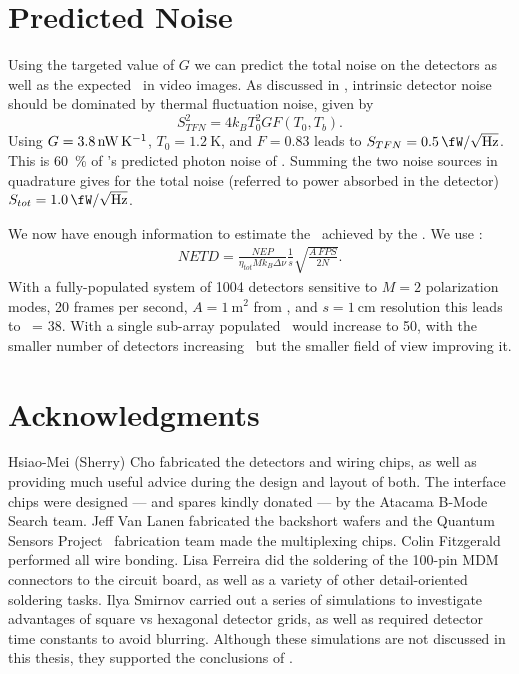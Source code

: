 \section{Predicted Noise} \label{sec:ch5-predicted-noise}

Using the targeted value of $G$ we can predict the total noise on the detectors as well as the expected \NETD\ in video images.
As discussed in , intrinsic detector noise should be dominated by thermal fluctuation noise, given by
\begin{equation}
  S^2_{TFN} = 4 k_B T_0^2 G F(T_0, T_b).
\end{equation}
Using $G = \SI{3.8}{\nW\per\K}$, $T_0 = \SI{1.2}{\K}$, and $F = 0.83$ leads to $S_{TFN} = \Pnoisef{0.5}$.
This is \SI{60}{\percent} of 's predicted photon noise of .
Summing the two noise sources in quadrature gives for the total noise (referred to power absorbed in the detector) $S_{tot} = \Pnoisef{1.0}$.

We now have enough information to estimate the \NETD\ achieved by the \Imager.
We use :
\begin{align}
  NETD = \frac{NEP}{\eta_{tot} M k_B \Delta \nu} \frac{1}{s} \sqrt{\frac{A\,FPS}{2 N}} .
\end{align}
With a fully-populated system of 1004 detectors sensitive to $M=2$ polarization modes, 20 frames per second, $A = \SI{1}{\m^2}$ from , and $ s = \SI{1}{\cm}$ resolution this leads to \NETD\ = \SI{38}{\mK}.
With a single sub-array populated \NETD\ would increase to \SI{50}{\mK}, with the smaller number of detectors increasing \NETD\ but the smaller field of view improving it. 

\section{Acknowledgments}

Hsiao-Mei (Sherry) Cho fabricated the detectors and wiring chips, as well as providing much useful advice during the design and layout of both.
The interface chips were designed --- and spares kindly donated --- by the Atacama B-Mode Search team.
Jeff Van Lanen fabricated the backshort wafers and the Quantum Sensors Project \SQUID\ fabrication team made the multiplexing chips.
Colin Fitzgerald performed all wire bonding.
Lisa Ferreira did the soldering of the 100-pin MDM connectors to the circuit board, as well as a variety of other detail-oriented soldering tasks.
Ilya Smirnov carried out a series of simulations to investigate advantages of square vs hexagonal detector grids, as well as required detector time constants to avoid blurring.
Although these simulations are not discussed in this thesis, they supported the conclusions of .
